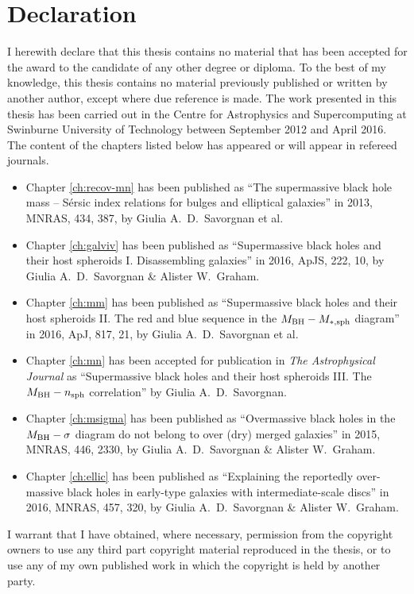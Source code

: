 \chapter*{Declaration}

I herewith declare that this thesis contains no material that has been accepted 
for the award to the candidate of any other degree or diploma. 
To the best of my knowledge, 
this thesis contains no material previously published or written by another author, 
except where due reference is made.
The work presented in this thesis has been carried out 
in the Centre for Astrophysics and Supercomputing 
at Swinburne University of Technology between September 2012 and April 2016. 
The content of the chapters listed below has appeared or will appear in refereed journals. 

\begin{itemize}

\item Chapter \ref{ch:recov-mn} has been published as 
``The supermassive black hole mass -- S\'ersic index relations for bulges and elliptical galaxies''
in 2013, MNRAS, 434, 387, by Giulia A.~D.~Savorgnan et al.

\item Chapter \ref{ch:galviv} has been published as 
``Supermassive black holes and their host spheroids I. Disassembling galaxies'' 
in 2016, ApJS, 222, 10, by Giulia A.~D.~Savorgnan \& Alister W.~Graham. 

\item Chapter \ref{ch:mm} has been published as 
``Supermassive black holes and their host spheroids 
II. The red and blue sequence in the $M_{\rm BH} - M_{\rm *,sph}$ diagram''
in 2016, ApJ, 817, 21, by Giulia A.~D.~Savorgnan et al.

\item Chapter \ref{ch:mn} has been accepted for publication in \emph{The Astrophysical Journal} as 
``Supermassive black holes and their host spheroids 
III. The $M_{\rm BH} - n_{\rm sph}$ correlation''
by Giulia A.~D.~Savorgnan.

\item Chapter \ref{ch:msigma} has been published as 
``Overmassive black holes in the $M_{\rm BH} - \sigma$ diagram do not belong to over (dry) merged galaxies''
in 2015, MNRAS, 446, 2330, by Giulia A.~D.~Savorgnan \& Alister W.~Graham. 

\item Chapter \ref{ch:ellic} has been published as 
``Explaining the reportedly over-massive black holes in early-type galaxies with intermediate-scale discs'' 
in 2016, MNRAS, 457, 320, by Giulia A.~D.~Savorgnan \& Alister W.~Graham. 

\end{itemize}

I warrant that I have obtained, where necessary, permission from the copyright owners to use 
any third part copyright material reproduced in the thesis, 
or to use any of my own published work in which the copyright 
is held by another party.
